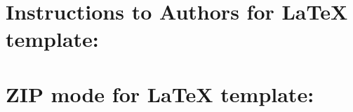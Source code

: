 \documentclass[3p,times,procedia,twocolumn,twoside]{elsarticle}
\begin{document}



%









\clearpage
\onecolumn

\normalMode

\section*{Instructions to Authors for LaTeX template:}

\section{ZIP mode for LaTeX template:}
\end{document}
